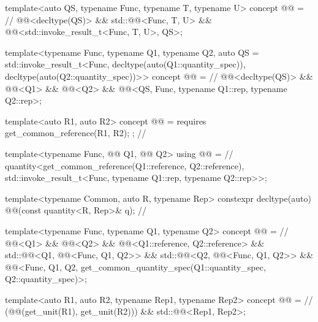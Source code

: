 \begin{codeblock}
{template<auto QS, typename Func, typename T, typename U>
concept @@ =                                                   // \expos
  @@<decltype(QS)> && std::@@<Func, T, U> &&
  @@<std::invoke_result_t<Func, T, U>, QS>;

template<typename Func, typename Q1, typename Q2,
         auto QS = std::invoke_result_t<Func, decltype(auto(Q1::quantity_spec)),
                                        decltype(auto(Q2::quantity_spec))>{}>
concept @@ =                                              // \expos
  @@<decltype(QS)> && @@<Q1> && @@<Q2> &&
  @@<QS, Func, typename Q1::rep, typename Q2::rep>;

template<auto R1, auto R2>
concept @@ = requires { get_common_reference(R1, R2); };  // \expos

template<typename Func, @@ Q1, @@ Q2>
using @@ =                                                // \expos
  quantity<get_common_reference(Q1::reference, Q2::reference),
           std::invoke_result_t<Func, typename Q1::rep, typename Q2::rep>>;

template<typename Common, auto R, typename Rep>
  constexpr decltype(auto) @@(const quantity<R, Rep>& q);         // \expos

template<typename Func, typename Q1, typename Q2>
concept @@ =                                      // \expos
  @@<Q1> && @@<Q2> &&
  @@<Q1::reference, Q2::reference> &&
  std::@@<Q1, @@<Func, Q1, Q2>> &&
  std::@@<Q2, @@<Func, Q1, Q2>> &&
  @@<Func, Q1, Q2,
                      get_common_quantity_spec(Q1::quantity_spec, Q2::quantity_spec)>;

template<auto R1, auto R2, typename Rep1, typename Rep2>
concept @@ =                                                      // \expos
  (@@(get_unit(R1), get_unit(R2))) && std::@@<Rep1, Rep2>;

}
\end{codeblock}
